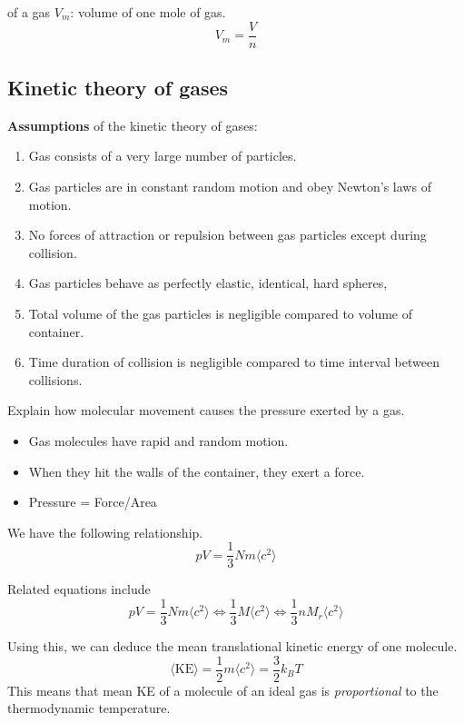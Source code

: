  of a gas $V_m$: volume of one mole of gas.
\[ V_m = \frac{V}{n} \]
\pagebreak

\subsection{Kinetic theory of gases}
\textbf{Assumptions} of the kinetic theory of gases:
\begin{enumerate}
\item Gas consists of a very large number of particles.
\item Gas particles are in constant random motion and obey Newton's laws of motion.
\item No forces of attraction or repulsion between gas particles except during collision.
\item Gas particles behave as perfectly elastic, identical, hard spheres,
\item Total volume of the gas particles is negligible compared to volume of container.
\item Time duration of collision is negligible compared to time interval between collisions.
\end{enumerate}

Explain how molecular movement causes the pressure exerted by a gas.
\begin{itemize}
\item Gas molecules have rapid and random motion.
\item When they hit the walls of the container, they exert a force.
\item Pressure = Force/Area
\end{itemize}

We have the following relationship.
\begin{equation}
pV = \frac{1}{3}Nm\langle c^2 \rangle
\end{equation}


Related equations include
\[ pV=\frac{1}{3}Nm\langle c^2\rangle \iff \frac{1}{3}M\langle c^2\rangle \iff \frac{1}{3}nM_r\langle c^2\rangle \]

Using this, we can deduce the mean translational kinetic energy of one molecule.
\begin{equation}
\langle\text{KE}\rangle=\frac{1}{2}m\langle c^2\rangle = \frac{3}{2}k_BT
\end{equation}
This means that mean KE of a molecule of an ideal gas is \emph{proportional} to the thermodynamic temperature.

